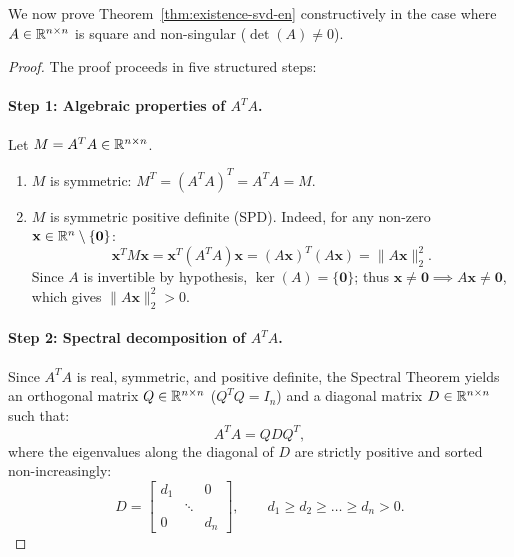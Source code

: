 We now prove Theorem~\ref{thm:existence-svd-en} constructively in the case where $A \in \mathbb{R}^{n \times n}$ is square and non-singular ($\det(A) \neq 0$).

\begin{proof}
The proof proceeds in five structured steps:

\paragraph{Step 1: Algebraic properties of $A^T A$.}
Let $M = A^T A \in \mathbb{R}^{n \times n}$.
\begin{enumerate}
    \item $M$ is symmetric: $M^T = (A^T A)^T = A^T A = M$.
    \item $M$ is symmetric positive definite (SPD). Indeed, for any non-zero $\mathbf{x} \in \mathbb{R}^n \setminus \{\mathbf{0}\}$:
    \begin{equation}
        \mathbf{x}^T M \mathbf{x} = \mathbf{x}^T (A^T A) \mathbf{x} = (A\mathbf{x})^T (A\mathbf{x}) = \|A\mathbf{x}\|_2^2.
    \end{equation}
    Since $A$ is invertible by hypothesis, $\ker(A) = \{\mathbf{0}\}$; thus $\mathbf{x} \neq \mathbf{0} \implies A\mathbf{x} \neq \mathbf{0}$, which gives $\|A\mathbf{x}\|_2^2 > 0$.
\end{enumerate}

\paragraph{Step 2: Spectral decomposition of $A^T A$.}
Since $A^T A$ is real, symmetric, and positive definite, the Spectral Theorem yields an orthogonal matrix $Q \in \mathbb{R}^{n \times n}$ ($Q^T Q = I_n$) and a diagonal matrix $D \in \mathbb{R}^{n \times n}$ such that:
\begin{equation}
    A^T A = Q D Q^T,
\end{equation}
where the eigenvalues along the diagonal of $D$ are strictly positive and sorted non-increasingly:
\begin{equation}
    D = \begin{bmatrix}
        d_1 & & 0 \\
        & \ddots & \\
        0 & & d_n
    \end{bmatrix}, \qquad d_1 \ge d_2 \ge \dots \ge d_n > 0.
\end{equation}


\end{proof}
